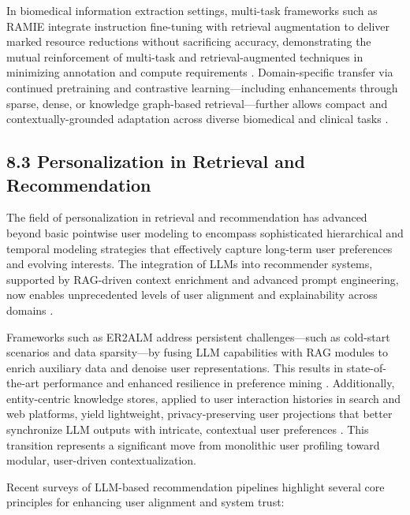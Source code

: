 \documentclass[11pt]{article}
\begin{document}
In biomedical information extraction settings, multi-task frameworks such as RAMIE integrate instruction fine-tuning with retrieval augmentation to deliver marked resource reductions without sacrificing accuracy, demonstrating the mutual reinforcement of multi-task and retrieval-augmented techniques in minimizing annotation and compute requirements \cite{ref32}. Domain-specific transfer via continued pretraining and contrastive learning—including enhancements through sparse, dense, or knowledge graph-based retrieval—further allows compact and contextually-grounded adaptation across diverse biomedical and clinical tasks \cite{ref33,ref55}.

\subsection{8.3 Personalization in Retrieval and Recommendation}

The field of personalization in retrieval and recommendation has advanced beyond basic pointwise user modeling to encompass sophisticated hierarchical and temporal modeling strategies that effectively capture long-term user preferences and evolving interests. The integration of LLMs into recommender systems, supported by RAG-driven context enrichment and advanced prompt engineering, now enables unprecedented levels of user alignment and explainability across domains \cite{ref3,ref4,ref5,ref11,ref13,ref19,ref21,ref23,ref24,ref30,ref32,ref33,ref34,ref36,ref39,ref52,ref55,ref61}.

Frameworks such as ER2ALM address persistent challenges—such as cold-start scenarios and data sparsity—by fusing LLM capabilities with RAG modules to enrich auxiliary data and denoise user representations. This results in state-of-the-art performance and enhanced resilience in preference mining \cite{ref36}. Additionally, entity-centric knowledge stores, applied to user interaction histories in search and web platforms, yield lightweight, privacy-preserving user projections that better synchronize LLM outputs with intricate, contextual user preferences \cite{ref39}. This transition represents a significant move from monolithic user profiling toward modular, user-driven contextualization.

Recent surveys of LLM-based recommendation pipelines highlight several core principles for enhancing user alignment and system trust:
\end{document}
